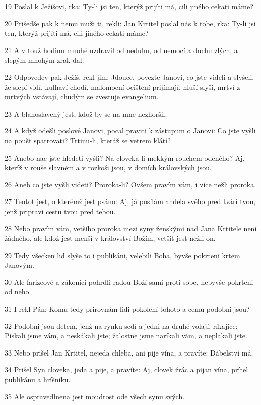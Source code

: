 \par 19 Poslal k Ježíšovi, rka: Ty-li jsi ten, kterýž prijíti má, cili jiného cekati máme?
\par 20 Prišedše pak k nemu muži ti, rekli: Jan Krtitel poslal nás k tobe, rka: Ty-li jsi ten, kterýž prijíti má, cili jiného cekati máme?
\par 21 A v touž hodinu mnohé uzdravil od neduhu, od nemocí a duchu zlých, a slepým mnohým zrak dal.
\par 22 Odpovedev pak Ježíš, rekl jim: Jdouce, povezte Janovi, co jste videli a slyšeli, že slepí vidí, kulhaví chodí, malomocní ocištení prijímají, hluší slyší, mrtví z mrtvých vstávají, chudým se zvestuje evangelium.
\par 23 A blahoslavený jest, kdož by se na mne nezhoršil.
\par 24 A když odešli poslové Janovi, pocal praviti k zástupum o Janovi: Co jste vyšli na poušt spatrovati? Trtinu-li, kteráž se vetrem klátí?
\par 25 Anebo nac jste hledeti vyšli? Na cloveka-li mekkým rouchem odeného? Aj, kteríž v rouše slavném a v rozkoši jsou, v domích královských jsou.
\par 26 Aneb co jste vyšli videti? Proroka-li? Ovšem pravím vám, i více nežli proroka.
\par 27 Tentot jest, o kterémž jest psáno: Aj, já posílám andela svého pred tvárí tvou, jenž pripraví cestu tvou pred tebou.
\par 28 Nebo pravím vám, vetšího proroka mezi syny ženskými nad Jana Krtitele není žádného, ale kdož jest menší v království Božím, vetšít jest nežli on.
\par 29 Tedy všecken lid slyše to i publikáni, velebili Boha, byvše pokrteni krtem Janovým.
\par 30 Ale farizeové a zákoníci pohrdli radou Boží sami proti sobe, nebyvše pokrteni od neho.
\par 31 I rekl Pán: Komu tedy prirovnám lidi pokolení tohoto a cemu podobni jsou?
\par 32 Podobni jsou detem, jenž na rynku sedí a jedni na druhé volají, ríkajíce: Pískali jsme vám, a neskákali jste; žalostne jsme naríkali vám, a neplakali jste.
\par 33 Nebo prišel Jan Krtitel, nejeda chleba, ani pije vína, a pravíte: Dábelství má.
\par 34 Prišel Syn cloveka, jeda a pije, a pravíte: Aj, clovek žrác a pijan vína, prítel publikánu a hríšníku.
\par 35 Ale ospravedlnena jest moudrost ode všech synu svých.
